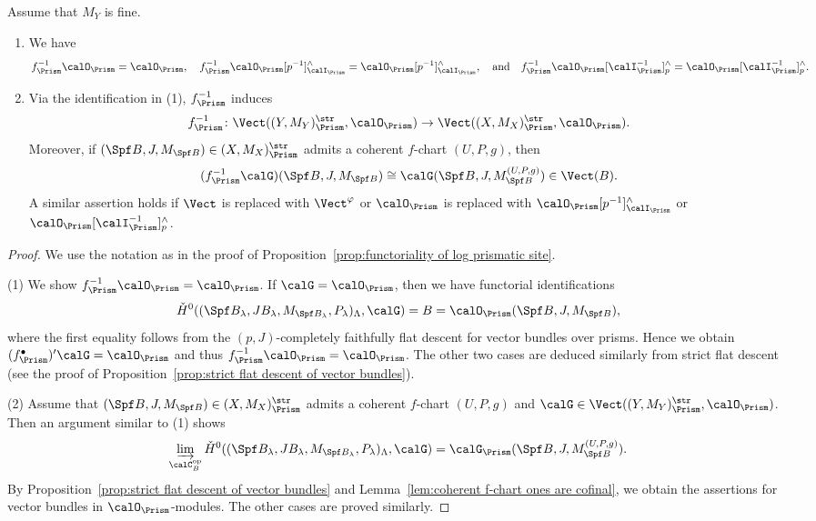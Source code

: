 \begin{prop} \label{prop: prismatic pullback of crystals}
Assume that $M_Y$ is fine. 
\begin{enumerate}
    \item We have
\[
f_\Prism^{-1}\calO_\Prism=\calO_\Prism, \quad f_\Prism^{-1}\calO_\Prism[p^{-1}]^\wedge_{\calI_\Prism}=\calO_\Prism[p^{-1}]^\wedge_{\calI_\Prism}, \quad\text{and}\quad
f_\Prism^{-1}\calO_\Prism[\calI_\Prism^{-1}]^\wedge_p=\calO_\Prism[\calI_\Prism^{-1 }]^\wedge_p.
\]
 \item
Via the identification in (1),  $f_\Prism^{-1}$ induces
\[
f_\Prism^{-1}\colon \Vect((Y,M_Y)_\Prism^{\str},\calO_\Prism)
\rightarrow \Vect((X,M_X)_\Prism^{\str},\calO_\Prism).
\]
Moreover, if $(\Spf B,J, M_{\Spf B})\in (X,M_X)_\Prism^{\str}$ admits a coherent $f$-chart $(U,P,g)$, then
\[
(f_\Prism^{-1}\calG)(\Spf B,J, M_{\Spf B})\cong \calG(\Spf B,J, M_{\Spf B}^{(U,P,g)}) \in \Vect(B).
\]
A similar assertion holds if $\Vect$ is replaced with $\Vect^\varphi$ or  $\calO_\Prism$ is replaced with $\calO_\Prism[p^{-1}]^\wedge_{\calI_\Prism}$ or $\calO_\Prism[\calI_\Prism^{-1}]^\wedge_p$.
\end{enumerate}
\end{prop}

\begin{proof}
We use the notation as in the proof of Proposition~\ref{prop:functoriality of log prismatic site}.

(1)
We show $f_\Prism^{-1}\calO_\Prism=\calO_\Prism$. If $\calG=\calO_\Prism$, then we have functorial identifications
\[
\check{H}^0((\Spf B_\lambda, JB_\lambda, M_{\Spf B_\lambda}, P_\lambda)_{\Lambda},\calG)=B=\calO_\Prism(\Spf B,J,M_{\Spf B}),
\]
where the first equality follows from the $(p,J)$-completely faithfully flat descent for vector bundles over prisms. Hence we obtain $(f_\Prism^\bullet)'\calG=\calO_\Prism$ and thus $f_\Prism^{-1}\calO_\Prism=\calO_\Prism$. The other two cases are deduced similarly from strict flat descent (see the proof of Proposition~\ref{prop:strict flat descent of vector bundles}).

(2) Assume that $(\Spf B,J, M_{\Spf B})\in (X,M_X)_\Prism^{\str}$ admits a coherent $f$-chart $(U,P,g)$ and $\calG\in \Vect((Y,M_Y)_\Prism^{\str},\calO_\Prism)$.  Then an argument similar to (1) shows
\[
\varinjlim_{\calC_B^{\mathrm{op}}}\check{H}^0((\Spf B_\lambda, JB_\lambda, M_{\Spf B_\lambda}, P_\lambda)_{\Lambda},\calG)=\calG_\Prism(\Spf B,J,M_{\Spf B}^{(U,P,g)}).
\]
By Proposition~\ref{prop:strict flat descent of vector bundles} and Lemma~\ref{lem:coherent f-chart ones are cofinal}, we obtain the assertions for vector bundles in  $\calO_\Prism$-modules. The other cases are proved similarly.
\end{proof}

